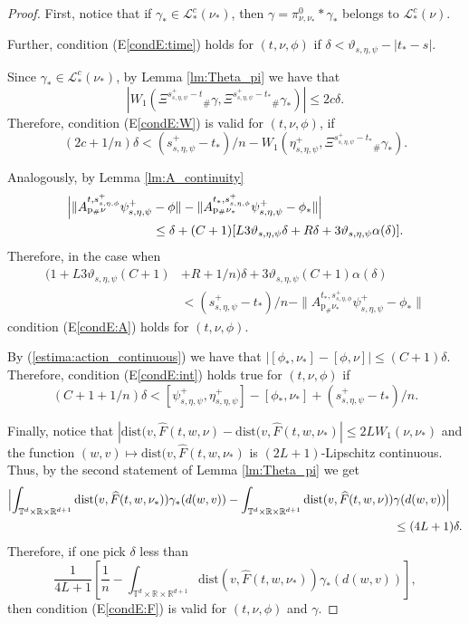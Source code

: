 \documentclass[a4paper,12pt]{article}
\newcommand{\rdp}{\mathbb{R}^{d+1}}
\newcommand{\tdr}{\mathbb{T}^{d}\times\mathbb{R}}
\begin{document}
\begin{proof}
	First, notice that if $\gamma_*\in\mathcal{L}_*^c(\nu_*)$, then 	
	$\gamma=\pi^0_{\nu,\nu_*}*\gamma_*$ belongs to 	$\mathcal{L}_*^c(\nu)$. 
	
	Further,  condition (E\ref{condE:time}) holds for $(t,\nu,\phi)$ if $\delta<\vartheta_{s,\eta,\psi}-|t_*-s|$.  	
	
	Since $\gamma_*\in\mathcal{L}_*^c(\nu_*)$, by Lemma \ref{lm:Theta_pi} we have that $$|W_1(\Xi^{s^+_{s,\eta,\psi}-t}{}_\#\gamma,\Xi^{s^+_{s,\eta,\psi}-t_*}{}_\#\gamma_*)|\leq 2c\delta. $$ Therefore, condition (E\ref{condE:W}) is valid for $(t,\nu,\phi)$, if
	$$(2c+1/n)\delta<(s^+_{s,\eta,\psi}-t_*)/n-W_1(\eta^+_{s,\eta,\psi},\Xi^{s^+_{s,\eta,\psi}-t_*}{}_\#\gamma_*). $$
	
	Analogously, by Lemma \ref{lm:A_continuity} 
	\begin{equation*}\begin{split}
	\Bigl|\|A^{t,s^+_{s,\eta,\phi}}_{\mathrm{p}_\#\nu}\psi^+_{s,\eta,\psi}&-\phi\|- \|A^{t_*,s^+_{s,\eta,\phi}}_{\mathrm{p}_\#\nu_*}\psi^+_{s,\eta,\psi}-\phi_*\|\Bigr|\\&\leq \delta+ (C+1)[L3\vartheta_{s,\eta,\psi}\delta+R\delta+3\vartheta_{s,\eta,\psi}\alpha(\delta)]. \end{split}
	\end{equation*} Therefore, in the case when
	\begin{equation*}
	\begin{split}
	(1+L3\vartheta_{s,\eta,\psi}(C+1)&+R+1/n)\delta+3\vartheta_{s,\eta,\psi}(C+1)\alpha(\delta)\\
	&<(s^+_{s,\eta,\psi}-t_*)/n-\|A^{t_*,s^+_{s,\eta,\phi}}_{\mathrm{p}_\#\nu_*}\psi^+_{s,\eta,\psi}-\phi_*\| 
	\end{split}
	\end{equation*} condition (E\ref{condE:A}) holds for $(t,\nu,\phi)$. 
	
	By (\ref{estima:action_continuous}) we have that $|[\phi_*,\nu_*]-[\phi,\nu]|\leq (C+1)\delta$. Therefore, condition (E\ref{condE:int}) holds true for $(t,\nu,\phi)$ if 
	$$(C+1+1/n)\delta<[\psi^+_{s,\eta,\psi},\eta^+_{s,\eta,\psi}]- [\phi_*,\nu_*]+(s^+_{s,\eta,\psi}-t_*)/n. $$
	
	Finally, notice that $|\mathrm{dist}(v,\widehat{F}(t,w,\nu)-\mathrm{dist}(v,\widehat{F}(t,w,\nu_*)|\leq 2LW_1(\nu,\nu_*)$ and the function $(w,v)\mapsto \mathrm{dist}(v,\widehat{F}(t,w,\nu_*)$ is $(2L+1)$-Lipschitz continuous. Thus, by the second statement of Lemma \ref{lm:Theta_pi} we get
	\begin{equation*}
	\begin{split}
	\Bigl|\int_{\tdr\times\rdp}\mathrm{dist}(v,\widehat{F}(t,w,\nu_*))\gamma_*(d(w,v))-\int_{\tdr\times\rdp}\mathrm{dist}(v,\widehat{F}(t,w,\nu))&\gamma(d(w,v))\Bigr|
	\\ &\leq (4L+1)\delta. 
	\end{split}
	\end{equation*}
	Therefore, if one pick $\delta$ less than
	$$\frac{1}{4L+1}\left[\frac{1}{n}-\int_{\tdr\times\rdp}\mathrm{dist}(v,\widehat{F}(t,w,\nu_*))\gamma_*(d(w,v))\right], $$ then condition (E\ref{condE:F}) is valid for $(t,\nu,\phi)$ and $\gamma$.
	

\end{proof}
\end{document}
